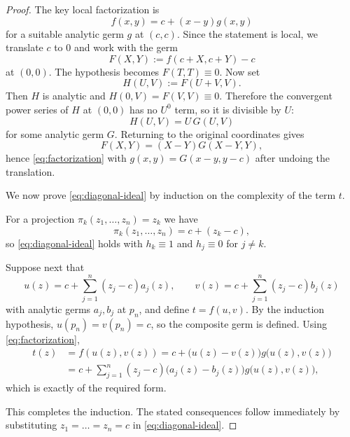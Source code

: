 \documentclass[12pt]{amsart}
\theoremstyle{remark}
\begin{document}
\begin{proof}
The key local factorization is
\begin{equation}\label{eq:factorization}
f(x,y)=c+(x-y)g(x,y)
\end{equation}
for a suitable analytic germ $g$ at $(c,c)$.  Since the statement is local, we translate $c$ to $0$ and work with the germ
\[
F(X,Y):=f(c+X,c+Y)-c
\]
at $(0,0)$.  The hypothesis becomes $F(T,T)\equiv 0$.  Now set
\[
H(U,V):=F(U+V,V).
\]
Then $H$ is analytic and $H(0,V)=F(V,V)\equiv 0$.  Therefore the convergent power series of $H$ at $(0,0)$ has no $U^0$ term, so it is divisible by $U$:
\[
H(U,V)=U\,G(U,V)
\]
for some analytic germ $G$.  Returning to the original coordinates gives
\[
F(X,Y)=(X-Y)G(X-Y,Y),
\]
hence \eqref{eq:factorization} with $g(x,y)=G(x-y,y-c)$ after undoing the translation.

We now prove \eqref{eq:diagonal-ideal} by induction on the complexity of the term $t$.

For a projection $\pi_k(z_1,\dots,z_n)=z_k$ we have
\[
\pi_k(z_1,\dots,z_n)=c+(z_k-c),
\]
so \eqref{eq:diagonal-ideal} holds with $h_k\equiv 1$ and $h_j\equiv 0$ for $j\neq k$.

Suppose next that
\[
u(z)=c+\sum_{j=1}^n(z_j-c)a_j(z),
\qquad
v(z)=c+\sum_{j=1}^n(z_j-c)b_j(z)
\]
with analytic germs $a_j,b_j$ at $p_n$, and define $t=f(u,v)$.  By the induction hypothesis, $u(p_n)=v(p_n)=c$, so the composite germ is defined.  Using \eqref{eq:factorization},
\[
\begin{aligned}
t(z)
&=f(u(z),v(z))
 = c+\bigl(u(z)-v(z)\bigr)g\bigl(u(z),v(z)\bigr) \\
&= c+\sum_{j=1}^n (z_j-c)\bigl(a_j(z)-b_j(z)\bigr)g\bigl(u(z),v(z)\bigr),
\end{aligned}
\]
which is exactly of the required form.

This completes the induction.  The stated consequences follow immediately by substituting $z_1=\dots=z_n=c$ in \eqref{eq:diagonal-ideal}.\qedhere
\end{proof}
\end{document}
